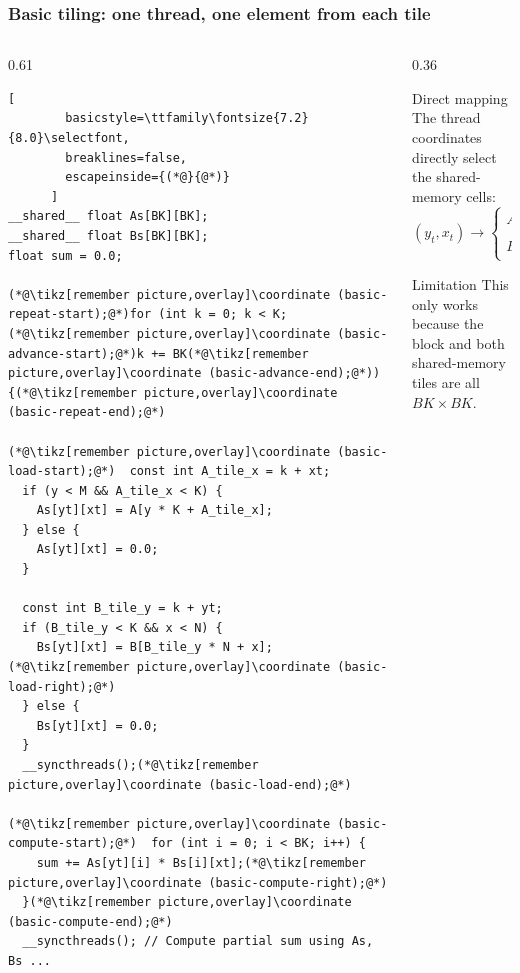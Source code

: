 \documentclass[../main.tex]{subfiles}
\begin{document}
\begin{frame}[fragile]
  \frametitle{Basic tiling: one thread, one element from each tile}

  \begin{columns}[T,onlytextwidth]
    \begin{column}{0.61\textwidth}
      \begin{lstlisting}[
        basicstyle=\ttfamily\fontsize{7.2}{8.0}\selectfont,
        breaklines=false,
        escapeinside={(*@}{@*)}
      ]
__shared__ float As[BK][BK];
__shared__ float Bs[BK][BK];
float sum = 0.0;

(*@\tikz[remember picture,overlay]\coordinate (basic-repeat-start);@*)for (int k = 0; k < K; (*@\tikz[remember picture,overlay]\coordinate (basic-advance-start);@*)k += BK(*@\tikz[remember picture,overlay]\coordinate (basic-advance-end);@*)) {(*@\tikz[remember picture,overlay]\coordinate (basic-repeat-end);@*)

(*@\tikz[remember picture,overlay]\coordinate (basic-load-start);@*)  const int A_tile_x = k + xt;
  if (y < M && A_tile_x < K) {
    As[yt][xt] = A[y * K + A_tile_x];
  } else {
    As[yt][xt] = 0.0;
  }

  const int B_tile_y = k + yt;
  if (B_tile_y < K && x < N) {
    Bs[yt][xt] = B[B_tile_y * N + x];(*@\tikz[remember picture,overlay]\coordinate (basic-load-right);@*)
  } else {
    Bs[yt][xt] = 0.0;
  }
  __syncthreads();(*@\tikz[remember picture,overlay]\coordinate (basic-load-end);@*)

(*@\tikz[remember picture,overlay]\coordinate (basic-compute-start);@*)  for (int i = 0; i < BK; i++) {
    sum += As[yt][i] * Bs[i][xt];(*@\tikz[remember picture,overlay]\coordinate (basic-compute-right);@*)
  }(*@\tikz[remember picture,overlay]\coordinate (basic-compute-end);@*)
  __syncthreads(); // Compute partial sum using As, Bs ...
      \end{lstlisting}
    \end{column}

    \begin{column}{0.36\textwidth}
      \begin{block}{Direct mapping}
        \small
        The thread coordinates directly select the shared-memory cells:
        \[
          (y_t,x_t) \longrightarrow
          \begin{cases}
            A_s[y_t][x_t]\\
            B_s[y_t][x_t]
          \end{cases}
        \]
      \end{block}
      \begin{alertblock}{Limitation}
        \small
        This only works because the block and both shared-memory tiles are all
        $BK\times BK$.
      \end{alertblock}
    \end{column}
  \end{columns}


\end{frame}
\end{document}
